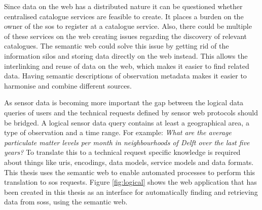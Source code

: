Since data on the web has a distributed nature it can be questioned whether centralised catalogue services are feasible to create. It places a burden on the owner of the \ac{sos} to register at a catalogue service. Also, there could be multiple of these services on the web creating issues regarding the discovery of relevant catalogues. The semantic web could solve this issue by getting rid of the information silos and storing data directly on the web instead. This allows the interlinking and reuse of data on the web, which makes it easier to find related data. Having semantic descriptions of observation metadata makes it easier to harmonise and combine different sources. 

As sensor data is becoming more important the gap between the logical data queries of users and the technical requests defined by sensor web protocols should be bridged. A logical sensor data query contains at least a geographical area, a type of observation and a time range. For example: \textit{What are the average particulate matter levels per month in neighbourhoods of Delft over the last five years?} To translate this to a technical request specific knowledge is required about things like \acp{uri}, encodings, data models, service models and data formats. This thesis uses the semantic web to enable automated processes to perform this translation to \ac{sos} requests. Figure \ref{fig:logical} shows the web application that has been created in this thesis as an interface for automatically finding and retrieving data from \aclp{sos}, using the semantic web. 

